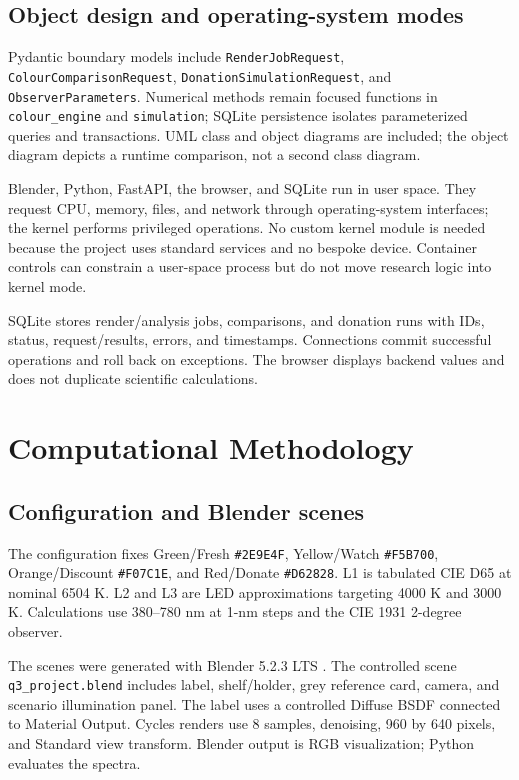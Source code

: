 \documentclass[journal]{IEEEtran}
\begin{document}
\subsection{Object design and operating-system modes}
Pydantic boundary models include \texttt{RenderJobRequest}, \texttt{ColourComparisonRequest}, \texttt{DonationSimulationRequest}, and \texttt{ObserverParameters}. Numerical methods remain focused functions in \texttt{colour\_engine} and \texttt{simulation}; SQLite persistence isolates parameterized queries and transactions. UML class and object diagrams are included; the object diagram depicts a runtime comparison, not a second class diagram.

Blender, Python, FastAPI, the browser, and SQLite run in user space. They request CPU, memory, files, and network through operating-system interfaces; the kernel performs privileged operations. No custom kernel module is needed because the project uses standard services and no bespoke device. Container controls can constrain a user-space process but do not move research logic into kernel mode.

SQLite stores render/analysis jobs, comparisons, and donation runs with IDs, status, request/results, errors, and timestamps. Connections commit successful operations and roll back on exceptions. The browser displays backend values and does not duplicate scientific calculations.

\section{Computational Methodology}
\subsection{Configuration and Blender scenes}
The configuration fixes Green/Fresh \texttt{\#2E9E4F}, Yellow/Watch \texttt{\#F5B700}, Orange/Discount \texttt{\#F07C1E}, and Red/Donate \texttt{\#D62828}. L1 is tabulated CIE D65 at nominal 6504 K. L2 and L3 are LED approximations targeting 4000 K and 3000 K. Calculations use 380--780 nm at 1-nm steps and the CIE 1931 2-degree observer.

The scenes were generated with Blender 5.2.3 LTS \cite{blender}. The controlled scene \texttt{q3\_project.blend} includes label, shelf/holder, grey reference card, camera, and scenario illumination panel. The label uses a controlled Diffuse BSDF connected to Material Output. Cycles renders use 8 samples, denoising, 960 by 640 pixels, and Standard view transform. Blender output is RGB visualization; Python evaluates the spectra.
\end{document}
